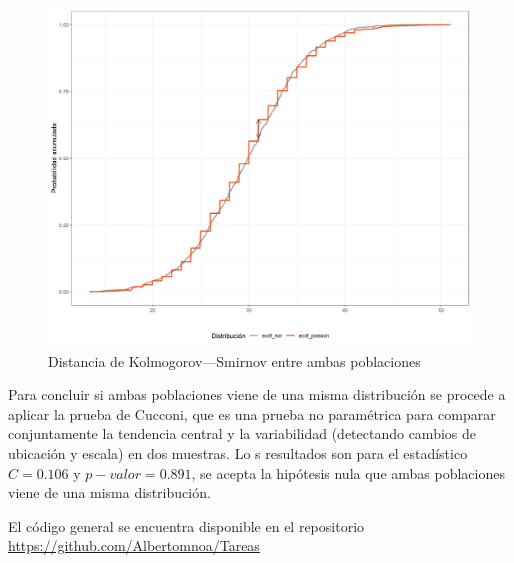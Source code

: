 \documentclass{article}
\begin{document}
\begin{center}
\begin{figure}
\includegraphics[scale=0.6]{figuras/distanciaKolmPN.png}
\caption{Distancia de Kolmogorov–--Smirnov entre ambas poblaciones}
\label{fig:9}
\end{figure}
\end{center}
 Para concluir si ambas poblaciones viene de una misma distribución se procede a aplicar la prueba de Cucconi, que es una prueba no paramétrica para comparar conjuntamente la tendencia central y la variabilidad (detectando cambios de ubicación y escala) en dos muestras. Lo s resultados son para el estadístico $C = 0.106$ y $p-valor = 0.891$, se acepta la hipótesis nula que ambas poblaciones viene de una misma distribución.


El código general se encuentra disponible en el repositorio \href{https://github.com/Albertomnoa/Tareas_MPA/tree/master/Tarea3}{https://github.com/Albertomnoa/Tareas} 

\newpage


\end{document}
